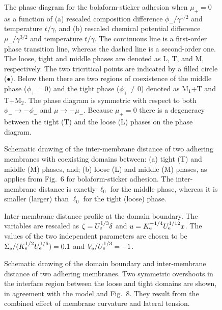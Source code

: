 \begin{figure}
\caption{
The phase diagram for the bolaform-sticker adhesion when $\mu_+=0$
as a function of (a) rescaled composition difference
$\phi_-/\gamma^{1/2}$ and temperature $t/\gamma$,
and (b) rescaled chemical potential difference $\mu_-/\gamma^{3/2}$ and
temperature $t/\gamma$.
The continuous line is a first-order phase transition line, whereas the
dashed line is a second-order one. The loose, tight and middle phases
are denoted as L, T, and M, respectively. The two tricritical points
are indicated by a filled circle ($\bullet$). Below them
there are two regions of coexistence of the middle phase ($\phi_+=0$)
and the tight phase ($\phi_+ \neq 0$) denoted as
M$_1$+T and T+M$_2$.
The phase diagram is symmetric with respect to both
$\phi_- \rightarrow -\phi_-$ and $\mu \rightarrow -\mu_-$.
Because $\mu_+=0$ there is a degeneracy between the tight (T)
and the loose (L) phases on the phase diagram.
}
\label{figphaseasym}
\end{figure}


\begin{figure}
\caption{
Schematic drawing of the inter-membrane distance
of two adhering
membranes with coexisting domains between:
(a) tight (T) and middle (M) phases, and;
(b)  loose (L) and middle (M) phases, as applies from Fig.\ 6
for bolaform-sticker adhesion.
The inter-membrane distance is exactly $\ell_0$ for the middle
phase, whereas it is smaller (larger) than $\ell_0$ for the tight
(loose) phase.
}
\label{figasym}
\end{figure}


\begin{figure}
\caption{
Inter-membrane distance profile at the domain boundary.
The variables are rescaled as
$\zeta = {U}_{\rm e}^{1/3} \delta$ and
$u = {K}_{\rm e}^{-1/4} {U}_{\rm e}^{1/12} x$.
The values of the two independent parameters are
chosen to be
${\Sigma}_{\rm e}/({K}_{\rm e}^{1/2}
{U}_{\rm e}^{1/6})=0.1$ and
${V}_{\rm e}/{U}_{\rm e}^{1/3}=-1$.
}
\label{profile}
\end{figure}

\begin{figure}
\caption{
Schematic drawing of the domain boundary
and inter-membrane distance of two adhering membranes.
Two symmetric overshoots in the interface region between the loose
and tight domains are shown, in agreement with the model and 
Fig.\ 8.
They result from the combined effect of membrane curvature and lateral
tension.
}
\label{overshoot}
\end{figure}



